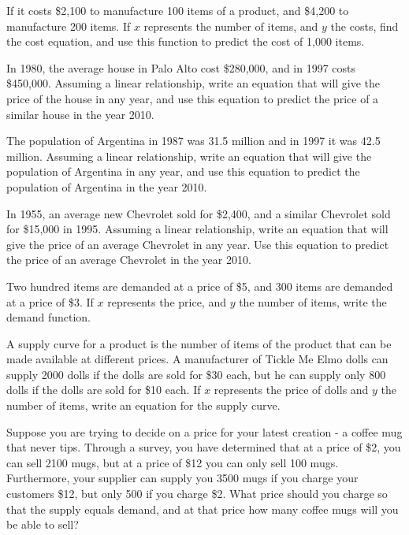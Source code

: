 \begin{puzzle}
    If it costs \$2,100 to manufacture 100 items of a product, and \$4,200 to manufacture 200 items. If $x$ represents the number of items, and $y$ the costs, find the cost equation, and use this function to predict the cost of 1,000 items.
\end{puzzle}

\begin{puzzle}
    In 1980, the average house in Palo Alto cost \$280,000, and in 1997 costs \$450,000. Assuming a linear relationship, write an equation that will give the price of the house in any year, and use this equation to predict the price of a similar house in the year 2010.
\end{puzzle}

\begin{puzzle}
    The population of Argentina in 1987 was 31.5 million and in 1997 it was 42.5 million. Assuming a linear relationship, write an equation that will give the population of Argentina in any year, and use this equation to predict the population of Argentina in the year 2010.
\end{puzzle}

\begin{puzzle}
    In 1955, an average new Chevrolet sold for \$2,400, and a similar Chevrolet sold for \$15,000 in 1995. Assuming a linear relationship, write an equation that will give the price of an average Chevrolet in any year. Use this equation to predict the price of an average Chevrolet in the year 2010.
\end{puzzle}

\begin{puzzle}
    Two hundred items are demanded at a price of \$5, and 300 items are demanded at a price of \$3. If \( x \) represents the price, and \( y \) the number of items, write the demand function.
\end{puzzle}

\begin{puzzle}
    A supply curve for a product is the number of items of the product that can be made available at different prices. A manufacturer of Tickle Me Elmo dolls can supply 2000 dolls if the dolls are sold for \$30 each, but he can supply only 800 dolls if the dolls are sold for \$10 each. If \( x \) represents the price of dolls and \( y \) the number of items, write an equation for the supply curve.
\end{puzzle}

\begin{puzzle}
    Suppose you are trying to decide on a price for your latest creation - a coffee mug that never tips. Through a survey, you have determined that at a price of \$2, you can sell 2100 mugs, but at a price of \$12 you can only sell 100 mugs. Furthermore, your supplier can supply you 3500 mugs if you charge your customers \$12, but only 500 if you charge \$2. What price should you charge so that the supply equals demand, and at that price how many coffee mugs will you be able to sell?
\end{puzzle}

